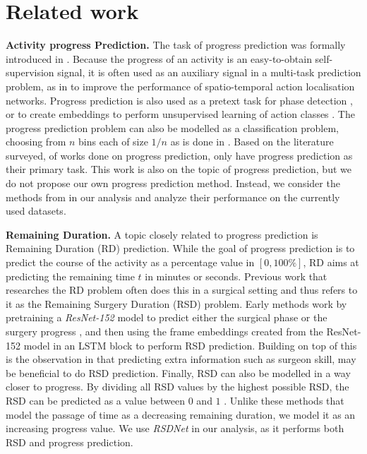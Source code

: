 \section{Related work}
\label{sec:related}


\noindent\textbf{Activity progress Prediction.} The task of progress prediction was formally introduced in \cite{becattini2017}. 
Because the progress of an activity is an easy-to-obtain self-supervision signal, it is often used as an auxiliary signal in a multi-task prediction problem, as in \cite{hu2019} to improve the performance of spatio-temporal action localisation networks. 
Progress prediction is also used as a pretext task for phase detection \cite{li2017}, or to create embeddings to perform unsupervised learning of action classes \cite{kukleva2019, vidalmata2020}. 
The progress prediction problem can also be modelled as a classification problem, choosing from $n$ bins each of size $1 / n$ as is done in \cite{han2017}. Based on the literature surveyed, of works done on progress prediction, only \cite{becattini2017, pucci2023} have progress prediction as their primary task. This work is also on the topic of progress prediction, but we do not propose our own progress prediction method. 
Instead, we consider the methods from \cite{becattini2017, kukleva2019} in our analysis and analyze their performance on the currently used datasets.

\smallskip\noindent\textbf{Remaining Duration.} A topic closely related to progress prediction is Remaining Duration (RD) prediction. 
While the goal of progress prediction is to predict the course of the activity as a percentage value in $[0,100\%]$, RD aims at predicting the remaining time $t$ in minutes or seconds. Previous work that researches the RD problem often does this in a surgical setting \cite{aksamentov2017, marafioti2021, twinanda2019, wang2013} and thus refers to it as the Remaining Surgery Duration (RSD) problem. Early methods work by pretraining a \textsl{ResNet-152} model to predict either the surgical phase \cite{aksamentov2017} or the surgery progress \cite{twinanda2019}, and then using the frame embeddings created from the ResNet-152 model in an LSTM block to perform RSD prediction. 
Building on top of this is the observation in \cite{marafioti2021} that predicting extra information such as surgeon skill, may be beneficial to do RSD prediction.
Finally, RSD can also be modelled in a way closer to progress. By dividing all RSD values by the highest possible RSD, the RSD can be predicted as a value between $0$ and $1$ \cite{wang2023}. Unlike these methods that model the passage of time as a decreasing remaining duration, we model it as an increasing progress value. 
We use \textsl{RSDNet} \cite{twinanda2019} in our analysis, as it performs both RSD and progress prediction.


